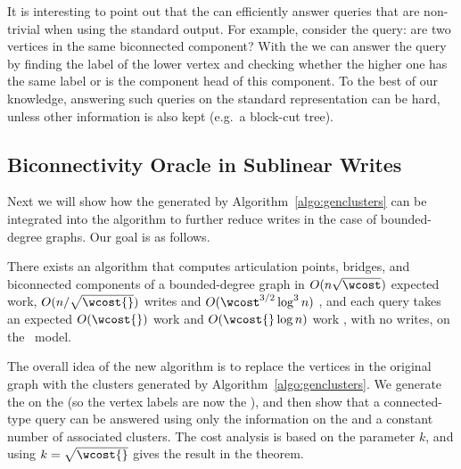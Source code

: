 It is interesting to point out that the \imprep{} can efficiently answer queries that are non-trivial when using the standard output.
For example, consider the query: are two vertices in the same biconnected component?  %
With the \imprep{} we can answer the query by finding the label of the lower vertex and checking whether the higher one has the same label or is the component head of this component.  To the best of our knowledge, answering such queries on the standard representation can be hard, unless other information is also kept (e.g.\ a block-cut tree).


\subsection{Biconnectivity Oracle in Sublinear Writes}\label{sec:biconn-sublinear}

Next we will show how the \implicit{} generated by Algorithm~\ref{algo:genclusters} can be integrated into the algorithm to further reduce writes in the case of bounded-degree graphs.  Our goal is as follows.

\begin{theorem}\label{thm:biconn}
There exists an algorithm that computes articulation points, bridges, and biconnected components of a bounded-degree graph in $O(n\sqrt{\wcost})$ expected work, $O(n/\sqrt{\wcost{}})$ writes and $O(\wcost^{3/2}\log^3n)$ \depth, and each query takes an expected $O(\wcost{})$ work and $O(\wcost{}\log n)$ work \whp{}, with no writes, on the \ourmodel\ model.
\end{theorem}

The overall idea of the new algorithm is to replace the vertices in the original graph with the clusters generated by Algorithm~\ref{algo:genclusters}.  We generate the \imprep{} on the \clustergraph{} (so the vertex labels are now the ), and then show that a connected-type query can be answered using only the information on the \clustergraph{} and a constant number of associated clusters.
The cost analysis is based on the parameter $k$, and using $k=\sqrt{\wcost{}}$ gives the result in the theorem.

